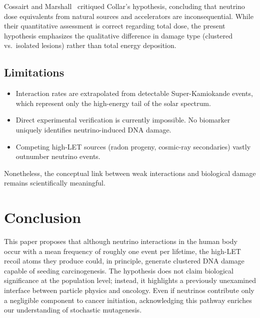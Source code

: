 \documentclass[12pt,a4paper]{article}
\begin{document}
Cossairt and Marshall~\cite{cossairt1997} critiqued Collar's hypothesis, concluding that neutrino dose equivalents from natural sources and accelerators are inconsequential. While their quantitative assessment is correct regarding total dose, the present hypothesis emphasizes the qualitative difference in damage type (clustered vs.\ isolated lesions) rather than total energy deposition.

\subsection{Limitations}

\begin{itemize}
\item Interaction rates are extrapolated from detectable Super-Kamiokande events, which represent only the high-energy tail of the solar spectrum.
\item Direct experimental verification is currently impossible. No biomarker uniquely identifies neutrino-induced DNA damage.
\item Competing high-LET sources (radon progeny, cosmic-ray secondaries) vastly outnumber neutrino events.
\end{itemize}

Nonetheless, the conceptual link between weak interactions and biological damage remains scientifically meaningful.

\section{Conclusion}

This paper proposes that although neutrino interactions in the human body occur with a mean frequency of roughly one event per lifetime, the high-LET recoil atoms they produce could, in principle, generate clustered DNA damage capable of seeding carcinogenesis. The hypothesis does not claim biological significance at the population level; instead, it highlights a previously unexamined interface between particle physics and oncology. Even if neutrinos contribute only a negligible component to cancer initiation, acknowledging this pathway enriches our understanding of stochastic mutagenesis.

\end{document}
